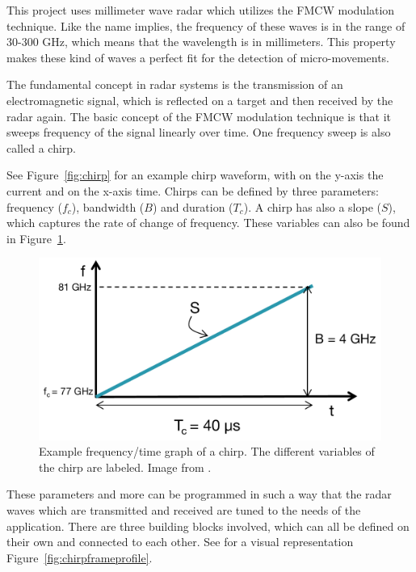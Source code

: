 This project uses millimeter wave radar which utilizes the FMCW modulation technique. Like the name implies, the frequency of these waves is in the range of 30-300 GHz, which means that the wavelength is in millimeters. This property makes these kind of waves a perfect fit for the detection of micro-movements.

The fundamental concept in radar systems is the transmission of an electromagnetic signal, which is reflected on a target and then received by the radar again. The basic concept of the FMCW modulation technique is that it sweeps frequency of the signal linearly over time. One frequency sweep is also called a chirp. 

See Figure~\ref{fig:chirp} for an example chirp waveform, with on the y-axis the current and on the x-axis time. Chirps can be defined by three parameters: frequency ($f_c$), bandwidth ($B$) and duration ($T_c$). A chirp has also a slope ($S$), which captures the rate of change of frequency. These variables can also be found in Figure~\ref{fig:chirpfreqtime}.

\begin{figure}[t]
\centering
\includegraphics[width=.6\textwidth]{figures/background/chirp_params.png}
\caption{Example frequency/time graph of a chirp. The different variables of the chirp are labeled. Image from \cite{mmwave_fundamentals_website}.}
\label{fig:chirpfreqtime}
\end{figure}

These parameters and more can be programmed in such a way that the radar waves which are transmitted and received are tuned to the needs of the application. There are three building blocks involved, which can all be defined on their own and connected to each other. See for a visual representation Figure~\ref{fig:chirpframeprofile}.

